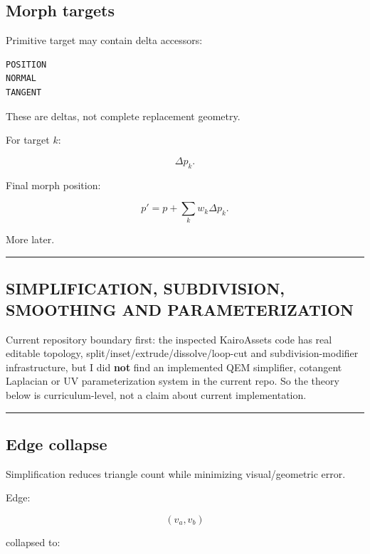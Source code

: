 \subsection{Morph targets}\label{04-visual-computing-ii-ch041-morph-targets}

Primitive target may contain delta accessors:

\begin{verbatim}
POSITION
NORMAL
TANGENT
\end{verbatim}

These are deltas, not complete replacement geometry.

For target \(k\):

\[
\Delta p_k.
\]

Final morph position:

\[
p'=p+\sum_k w_k\Delta p_k.
\]

More later.

\begin{center}\rule{0.5\linewidth}{0.5pt}\end{center}

\subsection{SIMPLIFICATION, SUBDIVISION, SMOOTHING AND PARAMETERIZATION}\label{04-visual-computing-ii-ch041-simplification-subdivision-smoothing-and-parameterization}

Current repository boundary first: the inspected KairoAssets code has real editable topology, split/inset/extrude/dissolve/loop-cut and subdivision-modifier infrastructure, but I did \textbf{not} find an implemented QEM simplifier, cotangent Laplacian or UV parameterization system in the current repo. So the theory below is curriculum-level, not a claim about current implementation.

\begin{center}\rule{0.5\linewidth}{0.5pt}\end{center}

\subsection{Edge collapse}\label{04-visual-computing-ii-ch041-edge-collapse}

Simplification reduces triangle count while minimizing visual/geometric error.

Edge:

\[
(v_a,v_b)
\]

collapsed to:

